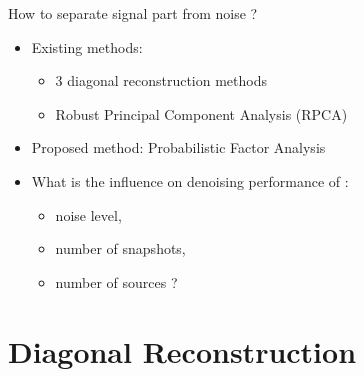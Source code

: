 \documentclass[10pt,xcolor=x11names,compress, notes=show]{beamer}%
\begin{document}
\begin{frame}{How to separate signal part from noise ?}
	 
	
	\begin{itemize}
		\item Existing methods:
			\begin{itemize}
			        \item 	3 diagonal reconstruction methods
		        		\item Robust Principal Component Analysis (RPCA)
			\end{itemize}
			
		\vfill\pause
	
		\item Proposed method: Probabilistic Factor Analysis

		\vfill \pause
		\item What is the influence on denoising performance of : 
		\begin{itemize}
		        \item noise level,
		        \item number of snapshots,
		        \item number of sources ?
		\end{itemize}
	\end{itemize}
\end{frame}


\section{Diagonal Reconstruction}
\begin{frame}
\tableofcontents[hideallsubsections]
\end{frame}
\begin{frame}
\end{frame}
\end{document}
